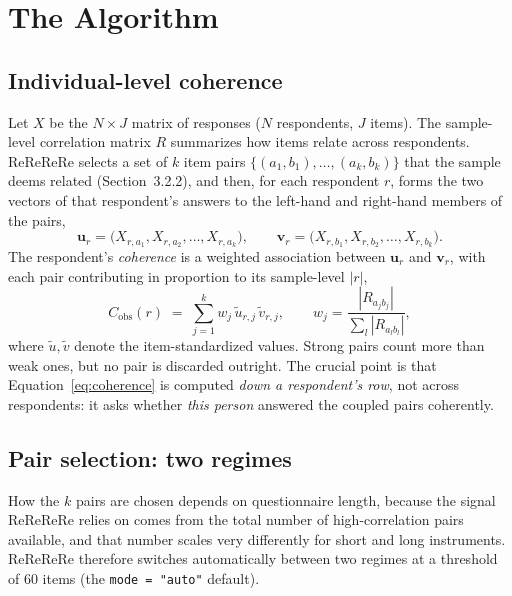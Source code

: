 \documentclass[doc,11pt,donotrepeattitle]{apa7}
\begin{document}
\section{The Algorithm}

\subsection{Individual-level coherence}

Let $X$ be the $N \times J$ matrix of responses ($N$ respondents, $J$ items).
The sample-level correlation matrix $R$ summarizes how items relate across
respondents. ReReReRe selects a set of $k$ item pairs $\{(a_1,b_1),\dots,
(a_k,b_k)\}$ that the sample deems related (Section~3.2.2), and then, for each
respondent $r$, forms the two vectors of that respondent's answers to the
left-hand and right-hand members of the pairs,
\[
\mathbf{u}_r = \big(X_{r,a_1}, X_{r,a_2}, \dots, X_{r,a_k}\big), \qquad
\mathbf{v}_r = \big(X_{r,b_1}, X_{r,b_2}, \dots, X_{r,b_k}\big).
\]
The respondent's \emph{coherence} is a weighted association between
$\mathbf{u}_r$ and $\mathbf{v}_r$, with each pair contributing in proportion to
its sample-level $|r|$,
\begin{equation}
C_{\text{obs}}(r) \;=\; \sum_{j=1}^{k} w_j \, \tilde{u}_{r,j}\,\tilde{v}_{r,j},
\qquad w_j = \frac{|R_{a_j b_j}|}{\sum_{l} |R_{a_l b_l}|},
\label{eq:coherence}
\end{equation}
where $\tilde{u}, \tilde{v}$ denote the item-standardized values. Strong pairs
count more than weak ones, but no pair is discarded outright. The crucial point
is that Equation~\ref{eq:coherence} is computed \emph{down a respondent's row},
not across respondents: it asks whether \emph{this person} answered the coupled
pairs coherently.

\subsection{Pair selection: two regimes}

How the $k$ pairs are chosen depends on questionnaire length, because the signal
ReReReRe relies on comes from the total number of high-correlation pairs
available, and that number scales very differently for short and long
instruments. ReReReRe therefore switches automatically between two regimes at a
threshold of 60 items (the \texttt{mode = "auto"} default).
\end{document}
